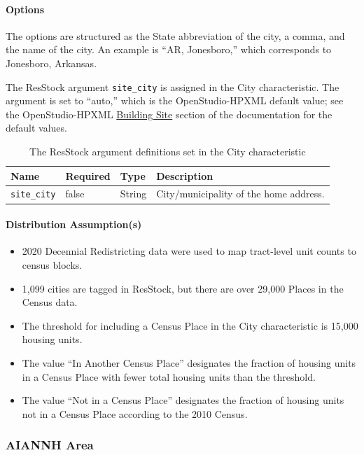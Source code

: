 \paragraph{Options}
The options are structured as the State abbreviation of the city, a comma, and the name of the city. An example is ``AR, Jonesboro,'' which corresponds to Jonesboro, Arkansas.

The ResStock argument \texttt{site\_city} is assigned in the City characteristic. The argument is set to ``auto,'' which is the OpenStudio-HPXML default value; see the OpenStudio-HPXML \href{https://openstudio-hpxml.readthedocs.io/en/v1.8.1/workflow_inputs.html#hpxml-building-site}{Building Site} section of the documentation for the default values.

\begin{longtable}[]{ |p{}|p{1.5cm}|p{1.1cm}|p{6cm}| }
\caption{The ResStock argument definitions set in the City characteristic} \label{table:hc_arg_def_city}  \\
\toprule\noalign{}
Name & Required & Type  & Description \\
\midrule\noalign{}
\endhead
\bottomrule\noalign{}
\endlastfoot
\texttt{site\_city} & false & String & City/municipality of the home
address. \\
\end{longtable}

\paragraph{Distribution Assumption(s)}
\begin{itemize}
\item
  2020 Decennial Redistricting data were used to map tract-level unit
  counts to census blocks.
\item
  1,099 cities are tagged in ResStock, but there are over 29,000 Places
  in the Census data.
\item
  The threshold for including a Census Place in the City characteristic is 15,000 housing units.
\item
  The value ``In Another Census Place'' designates the fraction of housing units in a Census Place with fewer total housing units than the threshold.
\item
  The value ``Not in a Census Place''
  designates the fraction of housing units not in a Census Place
  according to the 2010 Census.
\end{itemize}


\subsubsection{AIANNH Area}
